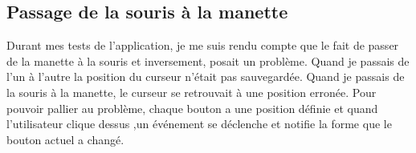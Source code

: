 \documentclass[a4paper,12pt,french]{sphinxmanual}
\begin{document}
\begin{sphinxVerbatim}[commandchars=\\\{\}]
                        \PYG{p}{[}\PYG{p}{]}\PYG{p}{[}\PYG{p}{]}
                          
                        \PYG{p}{[}\PYG{p}{]}\PYG{p}{[}\PYG{p}{]}
                 
\end{sphinxVerbatim}


\subsection{Passage de la souris à la manette}
\label{\detokenize{organique:passage-de-la-souris-a-la-manette}}
\sphinxAtStartPar
Durant mes tests de l’application, je me suis rendu compte que le fait de passer de la manette à la souris et inversement, posait un problème. Quand je passais de l’un à l’autre la position du curseur n’était pas sauvegardée. Quand je passais de la souris à la manette, le curseur se retrouvait à une position erronée. Pour pouvoir pallier au problème, chaque bouton a une position définie et quand l’utilisateur clique dessus ,un événement se déclenche et notifie la forme que le bouton actuel a changé.
\end{document}

